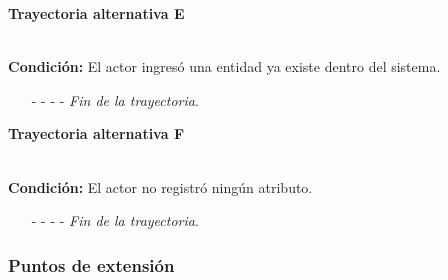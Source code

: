 \hypertarget{CU7-1:TAE}{\textbf{Trayectoria alternativa E}}\\
\noindent \textbf{Condición:} El actor ingresó una entidad ya existe dentro del sistema.
\begin{enumerate}
	\UCpaso[\UCsist] Muestra el mensaje  señalando el campo que presenta la duplicidad en la pantalla .
	\UCpaso Regresa al paso \ref{CU7.1-P3} de la trayectoria principal.
	\item[- -] - - {\em {Fin de la trayectoria}}.
\end{enumerate}
\hypertarget{CU7-1:TAF}{\textbf{Trayectoria alternativa F}}\\
\noindent \textbf{Condición:} El actor no registró ningún atributo.
\begin{enumerate}
	\UCpaso[\UCsist] Muestra el mensaje  en la sección de atributos de la pantalla .
	\UCpaso Regresa al paso \ref{CU7.1-P3} de la trayectoria principal.
	\item[- -] - - {\em {Fin de la trayectoria}}.
\end{enumerate}
\subsubsection{Puntos de extensión}

